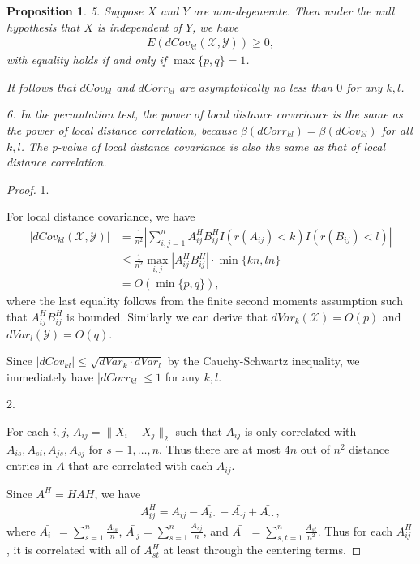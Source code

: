 \documentclass[12pt]{article}
\newtheorem{prop}{Proposition}
\begin{document}
\begin{prop}
5. Suppose $X$ and $Y$ are non-degenerate. Then under the null hypothesis that $X$ is independent of $Y$, we have
\begin{align*}
E(dCov_{kl}(\mathcal{X},\mathcal{Y})) \geq 0,
\end{align*}
with equality holds if and only if $\max\{p,q\} = 1$. 

It follows that $dCov_{kl}$ and $dCorr_{kl}$ are asymptotically no less than $0$ for any $k,l$.

6. In the permutation test, the power of local distance covariance is the same as the power of local distance correlation, because $\beta(dCorr_{kl})=\beta(dCov_{kl})$ for all $k,l$. The p-value of local distance covariance is also the same as that of local distance correlation.
\end{prop}
\begin{proof}
1.

For local distance covariance, we have
\begin{align*}
|dCov_{kl}(\mathcal{X},\mathcal{Y})| &= \frac{1}{n^2} |\sum_{i,j=1}^{n}A^{H}_{ij}B^{H}_{ij}I(r(A_{ij})<k)I(r(B_{ij})<l) | \\
                                   & \leq \frac{1}{n^2} \max_{i,j}|A^{H}_{ij}B^{H}_{ij}| \cdot \min\{kn,ln\} \\
																	 & = O(\min\{p,q\}),
\end{align*}
where the last equality follows from the finite second moments assumption such that $A^{H}_{ij}B^{H}_{ij}$ is bounded. Similarly we can derive that $dVar_{k}(\mathcal{X}) = O(p)$ and $dVar_{l}(\mathcal{Y}) = O(q)$. 

Since $|dCov_{kl}| \leq \sqrt{dVar_{k} \cdot dVar_{l}}$ by the Cauchy-Schwartz inequality, we immediately have $|dCorr_{kl}| \leq 1$ for any $k,l$.

2.

For each $i,j$, $A_{ij}=\|X_{i}-X_{j}\|_{2}$ such that $A_{ij}$ is only correlated with $A_{is}, A_{si},A_{js}, A_{sj}$ for $s=1,\ldots,n$. Thus there are at most $4n$ out of $n^2$ distance entries in $A$ that are correlated with each $A_{ij}$.

Since $A^{H}=HAH$, we have 
\begin{align*}
A^{H}_{ij}=A_{ij}-\bar{A_{i\cdot}}-\bar{A_{\cdot j}}+\bar{A_{\cdot \cdot}},
\end{align*}
where $\bar{A_{i\cdot}}=\sum_{s=1}^{n}\frac{A_{is}}{n}$, $\bar{A_{\cdot j}}=\sum_{s=1}^{n}\frac{A_{sj}}{n}$, and $\bar{A_{\cdot \cdot}}=\sum_{s,t=1}^{n}\frac{A_{st}}{n^2}$. Thus for each $A^{H}_{ij}$, it is correlated with all of $A^{H}_{st}$ at least through the centering terms.


\end{proof}
\end{document}
